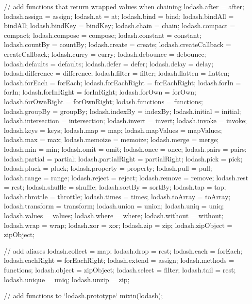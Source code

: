 \begin{DoxyCodeInclude}
    \textcolor{comment}{// add functions that return wrapped values when chaining}
    lodash.after = after;
    lodash.assign = assign;
    lodash.at = at;
    lodash.bind = bind;
    lodash.bindAll = bindAll;
    lodash.bindKey = bindKey;
    lodash.chain = chain;
    lodash.compact = compact;
    lodash.compose = compose;
    lodash.constant = constant;
    lodash.countBy = countBy;
    lodash.create = create;
    lodash.createCallback = createCallback;
    lodash.curry = curry;
    lodash.debounce = debounce;
    lodash.defaults = defaults;
    lodash.defer = defer;
    lodash.delay = delay;
    lodash.difference = difference;
    lodash.filter = filter;
    lodash.flatten = flatten;
    lodash.forEach = forEach;
    lodash.forEachRight = forEachRight;
    lodash.forIn = forIn;
    lodash.forInRight = forInRight;
    lodash.forOwn = forOwn;
    lodash.forOwnRight = forOwnRight;
    lodash.functions = functions;
    lodash.groupBy = groupBy;
    lodash.indexBy = indexBy;
    lodash.initial = initial;
    lodash.intersection = intersection;
    lodash.invert = invert;
    lodash.invoke = invoke;
    lodash.keys = keys;
    lodash.map = map;
    lodash.mapValues = mapValues;
    lodash.max = max;
    lodash.memoize = memoize;
    lodash.merge = merge;
    lodash.min = min;
    lodash.omit = omit;
    lodash.once = once;
    lodash.pairs = pairs;
    lodash.partial = partial;
    lodash.partialRight = partialRight;
    lodash.pick = pick;
    lodash.pluck = pluck;
    lodash.property = property;
    lodash.pull = pull;
    lodash.range = range;
    lodash.reject = reject;
    lodash.remove = \textcolor{keyword}{remove};
    lodash.rest = rest;
    lodash.shuffle = shuffle;
    lodash.sortBy = sortBy;
    lodash.tap = tap;
    lodash.throttle = throttle;
    lodash.times = times;
    lodash.toArray = toArray;
    lodash.transform = transform;
    lodash.union = \textcolor{keyword}{union};
    lodash.uniq = uniq;
    lodash.values = values;
    lodash.where = where;
    lodash.without = without;
    lodash.wrap = wrap;
    lodash.xor = xor;
    lodash.zip = zip;
    lodash.zipObject = zipObject;

    \textcolor{comment}{// add aliases}
    lodash.collect = map;
    lodash.drop = rest;
    lodash.each = forEach;
    lodash.eachRight = forEachRight;
    lodash.extend = assign;
    lodash.methods = functions;
    lodash.object = zipObject;
    lodash.select = filter;
    lodash.tail = rest;
    lodash.unique = uniq;
    lodash.unzip = zip;

    \textcolor{comment}{// add functions to `lodash.prototype`}
    mixin(lodash);


\end{DoxyCodeInclude}
